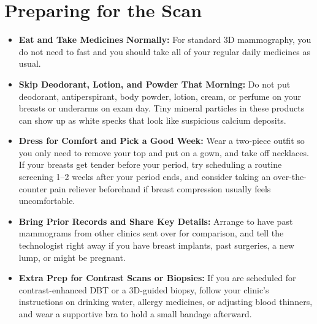\section{Preparing for the Scan}
\begin{itemize}
\item \textbf{Eat and Take Medicines Normally:} For standard 3D mammography, you do not need to fast and you should take all of your regular daily medicines as usual.
\item \textbf{Skip Deodorant, Lotion, and Powder That Morning:} Do not put deodorant, antiperspirant, body powder, lotion, cream, or perfume on your breasts or underarms on exam day. Tiny mineral particles in these products can show up as white specks that look like suspicious calcium deposits.
\item \textbf{Dress for Comfort and Pick a Good Week:} Wear a two-piece outfit so you only need to remove your top and put on a gown, and take off necklaces. If your breasts get tender before your period, try scheduling a routine screening 1--2 weeks after your period ends, and consider taking an over-the-counter pain reliever beforehand if breast compression usually feels uncomfortable.
\item \textbf{Bring Prior Records and Share Key Details:} Arrange to have past mammograms from other clinics sent over for comparison, and tell the technologist right away if you have breast implants, past surgeries, a new lump, or might be pregnant.
\item \textbf{Extra Prep for Contrast Scans or Biopsies:} If you are scheduled for contrast-enhanced DBT or a 3D-guided biopsy, follow your clinic's instructions on drinking water, allergy medicines, or adjusting blood thinners, and wear a supportive bra to hold a small bandage afterward.
\end{itemize}

